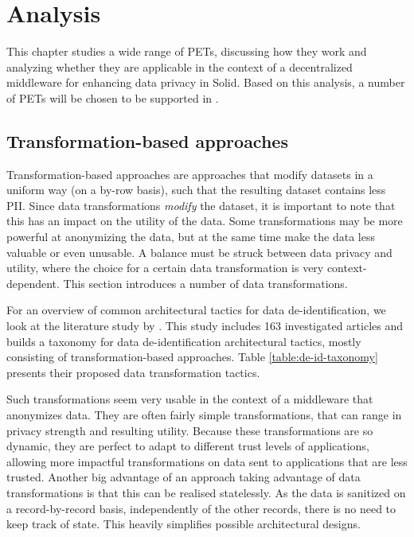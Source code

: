 \chapter{Analysis}
\label{chap:analysis}
This chapter studies a wide range of \gls{PETs}, discussing how they work and analyzing whether they are applicable in the context of a decentralized middleware for enhancing data privacy in Solid. Based on this analysis, a number of \gls{PETs} will be chosen to be supported in \middleware{}. 

\section{Transformation-based approaches}
\label{sec:transformation-approaches}
Transformation-based approaches are approaches that modify datasets in a uniform way (on a by-row basis), such that the resulting dataset contains less \gls{PII}. Since data transformations \textit{modify} the dataset, it is important to note that this has an impact on the utility of the data. Some transformations may be more powerful at anonymizing the data, but at the same time make the data less valuable or even unusable. A balance must be struck between data privacy and utility, where the choice for a certain data transformation is very context-dependent. This section introduces a number of data transformations.

For an overview of common architectural tactics for data de-identification, we look at the literature study by \citeauthor{de-id-taxonomy}. This study includes 163 investigated articles and builds a taxonomy for data de-identification architectural tactics, mostly consisting of transformation-based approaches. Table \ref{table:de-id-taxonomy} presents their proposed data transformation tactics.

Such transformations seem very usable in the context of a middleware that anonymizes data. They are often fairly simple transformations, that can range in privacy strength and resulting utility. Because these transformations are so dynamic, they are perfect to adapt to different trust levels of applications, allowing more impactful transformations on data sent to applications that are less trusted. Another big advantage of an approach taking advantage of data transformations is that this can be realised statelessly. As the data is sanitized on a record-by-record basis, independently of the other records, there is no need to keep track of state. This heavily simplifies possible architectural designs.
\newpage


